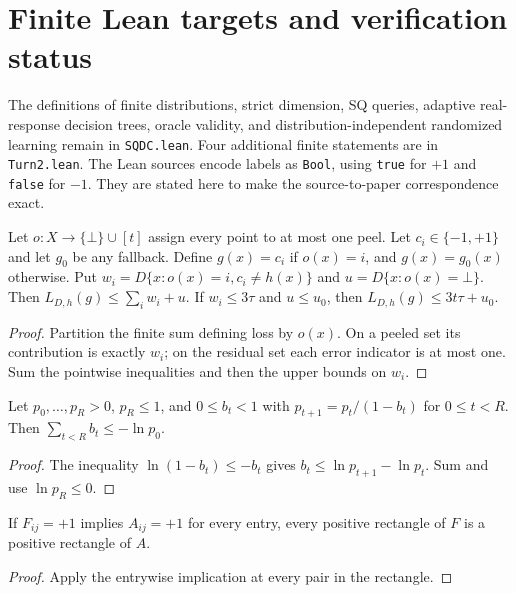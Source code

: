 \section{Finite Lean targets and verification status}\label{app:lean}
The definitions of finite distributions, strict dimension, SQ queries, adaptive real-response decision trees, oracle validity, and distribution-independent randomized learning remain in \texttt{SQDC.lean}. Four additional finite statements are in \texttt{Turn2.lean}. The Lean sources encode labels as \texttt{Bool}, using \texttt{true} for $+1$ and \texttt{false} for $-1$. They are stated here to make the source-to-paper correspondence exact.

\begin{samepage}
\begin{leanlemma}
Let $o:X\to\{\bot\}\cup[t]$ assign every point to at most one peel. Let $c_i\in\{-1,+1\}$ and let $g_0$ be any fallback. Define $g(x)=c_i$ if $o(x)=i$, and $g(x)=g_0(x)$ otherwise. Put $w_i=D\{x:o(x)=i,c_i\ne h(x)\}$ and $u=D\{x:o(x)=\bot\}$. Then $L_{D,h}(g)\le\sum_iw_i+u$. If $w_i\le3\tau$ and $u\le u_0$, then $L_{D,h}(g)\le3t\tau+u_0$.
\end{leanlemma}
\end{samepage}
\begin{proof}
Partition the finite sum defining loss by $o(x)$. On a peeled set its contribution is exactly $w_i$; on the residual set each error indicator is at most one. Sum the pointwise inequalities and then the upper bounds on $w_i$.
\end{proof}
\begin{samepage}
\begin{leanlemma}
Let $p_0,\ldots,p_R>0$, $p_R\le1$, and $0\le b_t<1$ with $p_{t+1}=p_t/(1-b_t)$ for $0\le t<R$. Then $\sum_{t<R}b_t\le-\ln p_0$.
\end{leanlemma}
\end{samepage}
\begin{proof}
The inequality $\ln(1-b_t)\le-b_t$ gives $b_t\le\ln p_{t+1}-\ln p_t$. Sum and use $\ln p_R\le0$.
\end{proof}
\begin{samepage}
\begin{leanlemma}
If $F_{ij}=+1$ implies $A_{ij}=+1$ for every entry, every positive rectangle of $F$ is a positive rectangle of $A$.
\end{leanlemma}
\end{samepage}
\begin{proof}
Apply the entrywise implication at every pair in the rectangle.
\end{proof}
